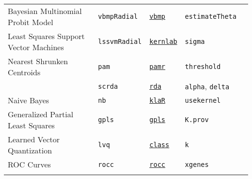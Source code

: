 \documentclass[12pt]{article}
\begin{document}
\begin{landscape}
\begin{longtable}{lllll}
\rowcolor[rgb]{.95, .95, .95}                     
      Bayesian Multinomial Probit Model  
      & \texttt{vbmpRadial} 
      &  {\tt \href{http://cran.r-project.org/web/packages/vbmp/index.html}{vbmp}} 
      & \texttt{estimateTheta} \\
      
      Least Squares Support Vector Machines &
         \texttt{lssvmRadial} & 
             {\tt \href{http://cran.r-project.org/web/packages/kernlab/index.html}{kernlab}}      & 
            \texttt{sigma} \\             
       
\rowcolor[rgb]{.95, .95, .95}                
      Nearest Shrunken Centroids&
         \texttt{pam} & 
             {\tt \href{http://cran.r-project.org/web/packages/pamr/index.html}{pamr}}        & 
            \texttt{threshold} \\  

\rowcolor[rgb]{.95, .95, .95}              
&
         \texttt{scrda} & 
             {\tt \href{http://cran.r-project.org/web/packages/rda/index.html}{rda}}        & 
            \texttt{alpha}, \texttt{delta} \\              
       
      Naive Bayes &
         \texttt{nb} & 
            {\tt \href{http://cran.r-project.org/web/packages/klaR/index.html}{klaR}}     & 
            \texttt{usekernel} \\
        
\rowcolor[rgb]{.95, .95, .95}                 
      Generalized Partial Least Squares&
         \texttt{gpls} & 
             {\tt \href{http://cran.r-project.org/web/packages/gpls/index.html}{gpls}}      & 
            \texttt{K.prov} \\
      
      Learned Vector  Quantization&
         \texttt{lvq} & 
             {\tt \href{http://cran.r-project.org/web/packages/class/index.html}{class}}       &          
            \texttt{k} \\  
     
\rowcolor[rgb]{.95, .95, .95}              
      ROC Curves &
         \texttt{rocc} & 
             {\tt \href{http://cran.r-project.org/web/packages/rocc/index.html}{rocc}}    &          
            \texttt{xgenes} \\                 
\label{label-name}
\end{longtable}
\end{landscape}
\pagestyle{fancy}
\end{document}
